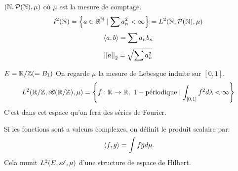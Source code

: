 \begin{example}
	$(\mathbb{N}, \mathcal{P}(\mathbb{N}), \mu)$ où $\mu$ est la mesure de comptage.
	$$l^2(\mathbb{N}) = \left\{ a \in \mathbb{R}^{\mathbb{N}} \mid \sum a_n^2 < \infty\right\} = L^2(\mathbb{N}, \mathcal{P}(\mathbb{N}), \mu)$$
	$$\left\langle a, b \right\rangle = \sum a_n b_n$$
	$$\left|\left|a\right|\right|_2 = \sqrt{\sum a_n^2}$$
\end{example}

\begin{example}
	$ E = \mathbb{R}/\mathbb{Z} ( = B_1)$
	On regarde $\mu$ la mesure de Lebesgue induite sur $[0,1]$.
	$$ L^2(\mathbb{R}/\mathbb{Z}, \mathscr{B} (\mathbb{R}/\mathbb{Z}), \mu) = \left\{ f: \mathbb{R} \to \mathbb{R}, \  1-\text{périodique} \mid \int_{[0,1]} f^2 d\lambda < \infty \right\} $$
	C'est dans cet espace qu'on fera des séries de Fourier.
\end{example}

\begin{remarque}
	Si les fonctions sont a valeurs complexes, on définit le produit scalaire par:
	$$\left\langle f, g \right\rangle = \int f \overline{g} d \mu$$
	Cela munit $L^2(E, \mathscr{A}, \mu)$ d'une structure de espace de Hilbert.
\end{remarque}
